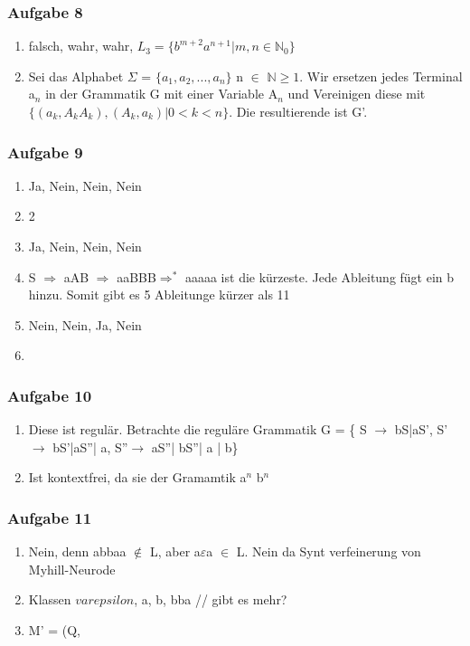 \documentclass[12pt]{scrartcl}
\begin{document}
\subsubsection{Aufgabe 8}
	\begin{enumerate}
		\item falsch, wahr, wahr, \(L_3=\{ b^{m+2} a^{n+1}| m,n \in \mathbb{N}_0 \}  \)
		\item Sei das Alphabet $\Sigma$ = \(\{a_1, a_2, ..., a_n  \}\) n $\in$ $\mathbb{N}\ge 1$. Wir ersetzen jedes Terminal a$_n$ in der Grammatik G mit einer Variable A$_n$ und Vereinigen diese mit\(\{ (a_k,A_k A_k),(A_k,a_k)| 0 < k < n \}\). Die resultierende ist G'.
	\end{enumerate}
	
\subsubsection{Aufgabe 9}
	\begin{enumerate}
		\item Ja, Nein, Nein, Nein
		\item 2
		\item Ja, Nein, Nein, Nein
		\item S $\Rightarrow$ aAB $\Rightarrow$ aaBBB$\Rightarrow^{*}$ aaaaa ist die kürzeste. Jede Ableitung fügt ein b hinzu. Somit gibt es 5 Ableitunge kürzer als 11
	\item Nein, Nein, Ja, Nein
	\item
	\end{enumerate}
\subsubsection{Aufgabe 10}
	\begin{enumerate}
		\item Diese ist regulär. Betrachte die reguläre Grammatik G = \{ S $\rightarrow$ bS|aS', S' $\rightarrow$ bS'|aS''| a, S''$\rightarrow$ aS''| bS''| a | b\}
		\item Ist kontextfrei, da sie der Gramamtik a$^{n}$ b$^{n}$
	\end{enumerate}
	
\subsubsection{Aufgabe 11}
\begin{enumerate}
	\item Nein, denn abbaa $\notin$ L, aber a$\varepsilon$a $\in$ L. Nein da Synt verfeinerung von Myhill-Neurode
	\item Klassen $varepsilon$, a, b, bba // gibt es mehr?
	\item M' = (Q, 
\end{enumerate}
\end{document}
